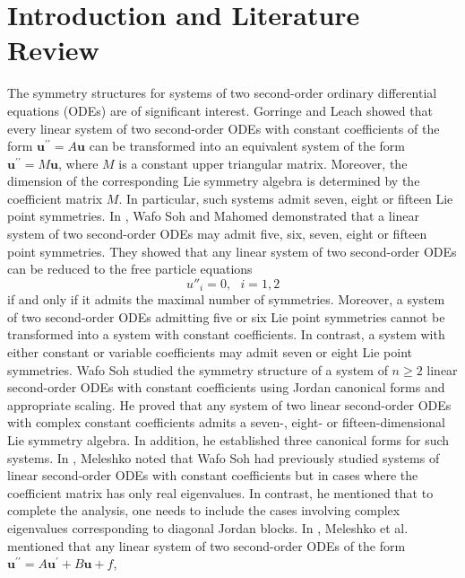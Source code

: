 \documentclass[12pt]{article}
\begin{document}
\section{Introduction and Literature Review}
 The symmetry structures for systems of two second-order ordinary differential equations (ODEs)  are of significant interest.  Gorringe and Leach \cite{p13} %
showed that every linear system of two second-order ODEs with constant coefficients of the form $\textbf{u}^{\prime\prime}=A\textbf{u}$ can be transformed into an equivalent system of the form $\textbf{u}^{\prime\prime}=M\textbf{u}$, where $M$ is a constant upper triangular matrix. Moreover, the  dimension of the corresponding Lie symmetry algebra is determined by the coefficient matrix $M$. In particular, such systems admit seven, eight or fifteen Lie point symmetries.
In \cite{R1}, Wafo Soh and Mahomed demonstrated that a linear system of two second-order ODEs may admit five, six, seven, eight or fifteen point symmetries. They showed that any linear system of two second-order ODEs can be reduced to the free particle equations 
\begin{equation}\label{two}
u''_i=0,~~~i=1,2
\end{equation}
 if and only if it admits the maximal number of symmetries. Moreover, a system of two second-order ODEs admitting five or six Lie point symmetries cannot be transformed into a system with constant coefficients. In contrast, a system with either constant or variable coefficients may admit seven or eight Lie point symmetries. Wafo Soh \cite{p37} studied the symmetry structure
of a system of $n\geq2$ linear second-order ODEs with constant coefficients using Jordan canonical forms and appropriate scaling. He proved that any system of two linear second-order ODEs with complex constant coefficients admits a seven-, eight- or fifteen-dimensional Lie symmetry algebra. In addition, he established three canonical forms for such systems. In \cite{p30}, Meleshko noted that Wafo Soh \cite{p37} had previously studied systems of linear second-order ODEs with constant coefficients but in cases where the coefficient matrix has only real eigenvalues. In contrast, he mentioned that to complete the analysis, one needs to include the cases involving complex eigenvalues corresponding to diagonal Jordan blocks. In \cite{p33}, Meleshko et al. mentioned that any linear system of two second-order ODEs of the form $\textbf{u}^{\prime\prime}=A\textbf{u}^{\prime}+B\textbf{u}+f$,
\end{document}
